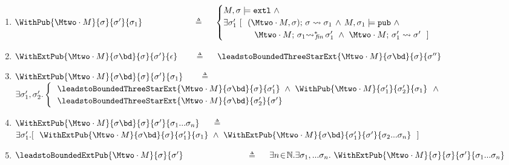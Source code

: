 {{\begin{definition}
\begin{enumerate}
\item
${\WithPub {\Mtwo\cdot M}    {\sigma}  {\sigma'} {\sigma_1}}$ \  \ \  \ \ \ \ \ \ \ \ $\triangleq$ \ \ 
$\begin{cases}
M, \sigma  \models \extThis \ \wedge \\
\exists   \sigma_1'\ [ \ \   \leadstoBoundedThree  {\Mtwo\cdot M} {\sigma} {\sigma}  {\sigma_{1}}\, \wedge\,  M, \sigma_1 \models \pubMeth \ \wedge \\ 
\strut \ \ \ \ \  \ \ \ \ \ \   \leadstoBoundedStarFin {\Mtwo\cdot M} {\sigma_1}  {\sigma_1'}  \ \wedge \   \leadstoBounded  {\Mtwo\cdot M} {\sigma_1'}      {\sigma'} \ \ ] 
\end{cases}
$

\item
$\WithExtPub {\Mtwo\cdot M} {\sigma\bd}  {\sigma}  {\sigma'} {\epsilon}$ \ \      \  $\triangleq$ \ \ 
$\leadstoBoundedThreeStarExt {\Mtwo\cdot M} {\sigma\bd}  {\sigma}  {\sigma''}$

\item
\label{four:defg23a}
$\WithExtPub {\Mtwo\cdot M} {\sigma\bd}  {\sigma}  {\sigma'} {\sigma_1}$  \ \ \  $\triangleq$ \ \ 
$\exists \sigma_1',\sigma_2'.  
\begin{cases}
 \ \   {\leadstoBoundedThreeStarExt {\Mtwo\cdot M} {\sigma\bd}  {\sigma}  {\sigma_1'}}\ \wedge\ 
{\WithPub {\Mtwo\cdot M}    {\sigma_1'}  {\sigma_2'} {\sigma_1}}  \ \ \wedge \\
 \ \  {\leadstoBoundedThreeStarExt {\Mtwo\cdot M} {\sigma\bd}  {\sigma_2'}  {\sigma'}}   \\
  \end{cases}$

 
\item
\label{four:defg23}
$\WithExtPub {\Mtwo\cdot M} {\sigma\bd}  {\sigma}  {\sigma'} {\sigma_1...\sigma_n}$   \ \  $\triangleq$ \ \ 
$\exists \sigma_1'.[ \  \
 \WithExtPub {\Mtwo\cdot M} {\sigma\bd}  {\sigma}  {\sigma_1'} {\sigma_1} 
  \ \wedge \ 
    {\WithExtPub {\Mtwo\cdot M} {\sigma\bd}  {\sigma_1'}  {\sigma'} {\sigma_2...\sigma_n} }   \  \ ]
$

\item
\label{six:g23}
$\leadstoBoundedExtPub {\Mtwo\cdot M}    {\sigma}  {\sigma'} $    \ \ \   \ \ \  \ \ \ \   \ \ \ \  $\triangleq$   \ \ 
 $ \exists n\!\in\! \mathbb{N}. \exists \sigma_1,...\sigma_n. \ \WithExtPub {\Mtwo\cdot M} {\sigma}  {\sigma}  {\sigma'} {\sigma_1...\sigma_n} 
$
\end{enumerate}
\end{definition}

}}

